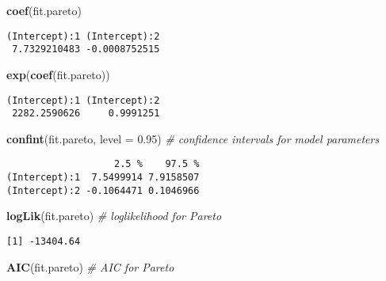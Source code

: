 \documentclass[]{book}
\newenvironment{Shaded}{\begin{snugshade}}{\end{snugshade}}
\newcommand{\KeywordTok}[1]{\textcolor[rgb]{0.13,0.29,0.53}{\textbf{#1}}}
\newcommand{\DataTypeTok}[1]{\textcolor[rgb]{0.13,0.29,0.53}{#1}}
\newcommand{\FloatTok}[1]{\textcolor[rgb]{0.00,0.00,0.81}{#1}}
\newcommand{\CommentTok}[1]{\textcolor[rgb]{0.56,0.35,0.01}{\textit{#1}}}
\newcommand{\NormalTok}[1]{#1}
\theoremstyle{definition}
\theoremstyle{definition}
\theoremstyle{definition}
\theoremstyle{remark}
\begin{document}
\begin{Shaded}
\begin{Highlighting}[]
\KeywordTok{coef}\NormalTok{(fit.pareto)}
\end{Highlighting}
\end{Shaded}

\begin{verbatim}
(Intercept):1 (Intercept):2 
 7.7329210483 -0.0008752515 
\end{verbatim}

\begin{Shaded}
\begin{Highlighting}[]
\KeywordTok{exp}\NormalTok{(}\KeywordTok{coef}\NormalTok{(fit.pareto))}
\end{Highlighting}
\end{Shaded}

\begin{verbatim}
(Intercept):1 (Intercept):2 
 2282.2590626     0.9991251 
\end{verbatim}

\begin{Shaded}
\begin{Highlighting}[]
\KeywordTok{confint}\NormalTok{(fit.pareto, }\DataTypeTok{level =} \FloatTok{0.95}\NormalTok{)  }\CommentTok{# confidence intervals for model parameters }
\end{Highlighting}
\end{Shaded}

\begin{verbatim}
                   2.5 %    97.5 %
(Intercept):1  7.5499914 7.9158507
(Intercept):2 -0.1064471 0.1046966
\end{verbatim}

\begin{Shaded}
\begin{Highlighting}[]
\KeywordTok{logLik}\NormalTok{(fit.pareto)                 }\CommentTok{# loglikelihood for Pareto}
\end{Highlighting}
\end{Shaded}

\begin{verbatim}
[1] -13404.64
\end{verbatim}

\begin{Shaded}
\begin{Highlighting}[]
\KeywordTok{AIC}\NormalTok{(fit.pareto)                    }\CommentTok{# AIC for Pareto}
\end{Highlighting}
\end{Shaded}
\end{document}
